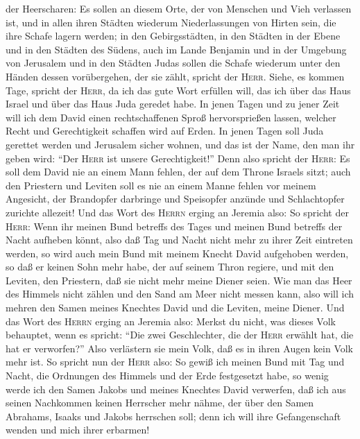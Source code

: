 der Heerscharen: Es sollen an diesem Orte, der von Menschen und Vieh
verlassen ist, und in allen ihren Städten wiederum Niederlassungen von
Hirten sein, die ihre Schafe lagern werden;  in den
Gebirgsstädten, in den Städten in der Ebene und in den Städten des
Südens, auch im Lande Benjamin und in der Umgebung von Jerusalem und in
den Städten Judas sollen die Schafe wiederum unter den Händen dessen
vorübergehen, der sie zählt, spricht der \textsc{Herr}. 
Siehe, es kommen Tage, spricht der \textsc{Herr}, da ich das gute Wort
erfüllen will, das ich über das Haus Israel und über das Haus Juda
geredet habe.  In jenen Tagen und zu jener Zeit will ich
dem David einen rechtschaffenen Sproß hervorsprießen lassen, welcher
Recht und Gerechtigkeit schaffen wird auf Erden.  In
jenen Tagen soll Juda gerettet werden und Jerusalem sicher wohnen, und
das ist der Name, den man ihr geben wird: ``Der \textsc{Herr} ist unsere
Gerechtigkeit!''  Denn also spricht der \textsc{Herr}: Es
soll dem David nie an einem Mann fehlen, der auf dem Throne Israels
sitzt;  auch den Priestern und Leviten soll es nie an
einem Manne fehlen vor meinem Angesicht, der Brandopfer darbringe und
Speisopfer anzünde und Schlachtopfer zurichte allezeit! 
Und das Wort des \textsc{Herrn} erging an Jeremia also: 
So spricht der \textsc{Herr}: Wenn ihr meinen Bund betreffs des Tages
und meinen Bund betreffs der Nacht aufheben könnt, also daß Tag und
Nacht nicht mehr zu ihrer Zeit eintreten werden,  so wird
auch mein Bund mit meinem Knecht David aufgehoben werden, so daß er
keinen Sohn mehr habe, der auf seinem Thron regiere, und mit den
Leviten, den Priestern, daß sie nicht mehr meine Diener seien.
 Wie man das Heer des Himmels nicht zählen und den Sand
am Meer nicht messen kann, also will ich mehren den Samen meines
Knechtes David und die Leviten, meine Diener.  Und das
Wort des \textsc{Herrn} erging an Jeremia also:  Merkst
du nicht, was dieses Volk behauptet, wenn es spricht: ``Die zwei
Geschlechter, die der \textsc{Herr} erwählt hat, die hat er verworfen?''
Also verlästern sie mein Volk, daß es in ihren Augen kein Volk mehr ist.
 So spricht nun der \textsc{Herr} also: So gewiß ich
meinen Bund mit Tag und Nacht, die Ordnungen des Himmels und der Erde
festgesetzt habe,  so wenig werde ich den Samen Jakobs
und meines Knechtes David verwerfen, daß ich aus seinen Nachkommen
keinen Herrscher mehr nähme, der über den Samen Abrahams, Isaaks und
Jakobs herrschen soll; denn ich will ihre Gefangenschaft wenden und mich
ihrer erbarmen!

